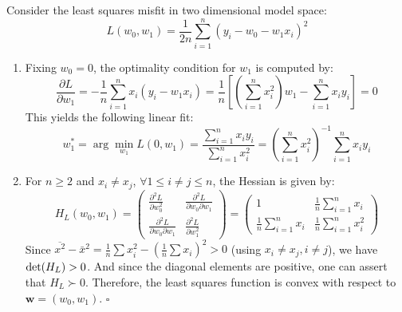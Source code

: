 \documentclass[a4paper, 10pt]{article}
\begin{document}
Consider the least squares misfit in two dimensional model space:
\begin{equation}
    L(w_0, w_1) = \frac{1}{2n} \sum_{i=1}^n (y_i - w_0 - w_1 x_i)^2
\end{equation}
\begin{enumerate}[label=(\alph*)]
    \item Fixing $w_0=0$, the optimality condition for $w_1$ is computed by:
    \begin{equation}
        \frac{\partial L}{\partial w_1} = -\frac{1}{n} \sum_{i=1}^n x_i(y_i - w_1 x_i) = \frac{1}{n} \left[\left(\sum_{i=1}^n x_i^2\right) w_1 - \sum_{i=1}^n x_i y_i \right] = 0
    \end{equation}
    This yields the following linear fit:
    \begin{equation}
        w_1^* = \arg\min_{w_1} L(0, w_1) = \frac{\sum_{i=1}^n x_i y_i}{\sum_{i=1}^n x_i^2} = \left(\sum_{i=1}^n x_i^2\right)^{-1} \sum_{i=1}^n x_i y_i
    \end{equation}
    
    \item For $n \geq 2$ and $x_i \neq x_j$, $\forall 1\leq i \neq j \leq n$, the Hessian is given by:
    \begin{equation}
        H_L(w_0, w_1) = 
        \begin{pmatrix}
            \frac{\partial^2 L}{\partial w_0^2} & \frac{\partial^2 L}{\partial w_0 \partial w_1} \\ 
            \frac{\partial^2 L}{\partial w_0 \partial w_1} & \frac{\partial^2 L}{\partial w_1^2}
        \end{pmatrix} = 
        \begin{pmatrix}
            1 & \frac{1}{n}\sum_{i=1}^n x_i \\ 
            \frac{1}{n}\sum_{i=1}^n x_i & \frac{1}{n} \sum_{i=1}^n x_i^2
        \end{pmatrix}
    \end{equation}
    Since $\overline{x^2} - \bar{x}^2 = \frac{1}{n}\sum x_i^2 - (\frac{1}{n}\sum x_i)^2 > 0$ (using $x_i \neq x_j, i\neq j$), we have ${\rm det}(H_L) > 0$. And since the diagonal elements are positive, one can assert that $H_L \succ 0$. Therefore, the least squares function is convex with respect to $\mathbf{w} = (w_0, w_1)$. $\square$
    

\end{enumerate}
\end{document}
